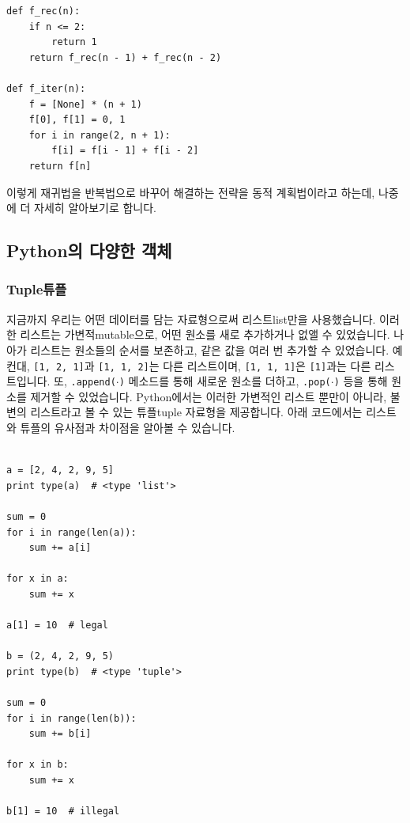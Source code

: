 \documentclass[../main.tex]{subfiles}
\begin{document}
\begin{verbatim}
def f_rec(n):
	if n <= 2:
		return 1
	return f_rec(n - 1) + f_rec(n - 2)

def f_iter(n):
	f = [None] * (n + 1)
	f[0], f[1] = 0, 1
	for i in range(2, n + 1):
		f[i] = f[i - 1] + f[i - 2]
	return f[n]
\end{verbatim}

이렇게 재귀법을 반복법으로 바꾸어 해결하는 전략을 동적 계획법이라고 하는데, 나중에 더 자세히 알아보기로 합니다.

\subsection{Python의 다양한 객체}
\subsubsection{Tuple튜플}
지금까지 우리는 어떤 데이터를 담는 자료형으로써 리스트list만을 사용했습니다.
이러한 리스트는 가변적mutable으로, 어떤 원소를 새로 추가하거나 없앨 수 있었습니다.
나아가 리스트는 원소들의 순서를 보존하고, 같은 값을 여러 번 추가할 수 있었습니다.
예컨대, \texttt{[1, 2, 1]}과 \texttt{[1, 1, 2]}는 다른 리스트이며, \texttt{[1, 1, 1]}은 \texttt{[1]}과는 다른 리스트입니다.
또, \texttt{.append($\cdot$)} 메소드를 통해 새로운 원소를 더하고, \texttt{.pop($\cdot$)} 등을 통해 원소를 제거할 수 있었습니다.
Python에서는 이러한 가변적인 리스트 뿐만이 아니라, 불변의 리스트라고 볼 수 있는 튜플tuple 자료형을 제공합니다.
아래 코드에서는 리스트와 튜플의 유사점과 차이점을 알아볼 수 있습니다.
\begin{verbatim}

a = [2, 4, 2, 9, 5]
print type(a)  # <type 'list'>

sum = 0
for i in range(len(a)):
	sum += a[i]

for x in a:
	sum += x

a[1] = 10  # legal

b = (2, 4, 2, 9, 5)
print type(b)  # <type 'tuple'>

sum = 0
for i in range(len(b)):
	sum += b[i]

for x in b:
	sum += x

b[1] = 10  # illegal
\end{verbatim}
\end{document}
